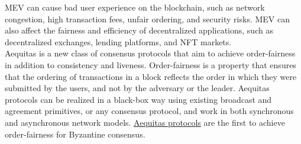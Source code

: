 \documentclass{report}
\begin{document}
 MEV can cause bad user experience on the blockchain, such as network congestion, high transaction fees, unfair ordering, and security risks. MEV can also affect the fairness and efficiency of decentralized applications, such as decentralized exchanges, lending platforms, and NFT markets.\\
 Aequitas is a new class of consensus protocols that aim to achieve order-fairness in addition to consistency and liveness. Order-fairness is a property that ensures that the ordering of transactions in a block reflects the order in which they were submitted by the users, and not by the adversary or the leader. Aequitas protocols can be realized in a black-box way using existing broadcast and agreement primitives, or any consensus protocol, and work in both synchronous and asynchronous network models. \href{https://eprint.iacr.org/2020/269.pdf}{Aequitas protocols} are the first to achieve order-fairness for Byzantine consensus.
\end{document}
